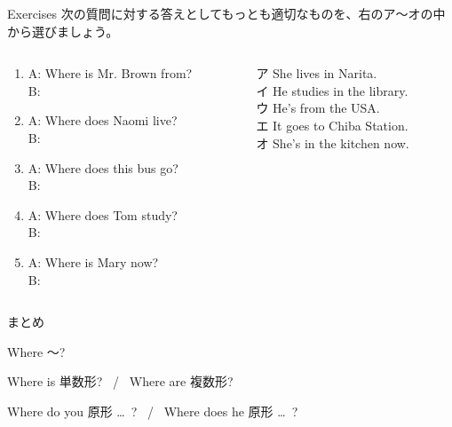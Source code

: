 \documentclass[aspectratio=169,xcolor={dvipsnames,table}]{beamer}
\begin{document}
\begin{frame}[plain]{Exercises}
 次の質問に対する答えとしてもっとも適切なものを、右のア～オの中から選びましょう。

\begin{columns}[t]
 \begin{column}{.475\textwidth}
\begin{enumerate}
 \item A: Where is Mr. Brown from?\\
B: 
 \item A: Where does Naomi live?\\
B: 
 \item A: Where does this bus go?\\
B: 
 \item A: Where does Tom study?\\
B: 
 \item A: Where is Mary now?\\
B: 
\end{enumerate}  
 \end{column}
\begin{column}{.475\textwidth}
\begin{tcolorbox}
ア She lives in Narita.\\
イ He studies in the library.\\
ウ He's from the USA.\\
エ It goes to Chiba Station.\\
オ She's in the kitchen now.
\end{tcolorbox} 
\mbox{}\hfill{}
\end{column}
\end{columns}
\end{frame}
\begin{frame}[plain]{まとめ}
 \begin{block}{Where ～?}
\begin{description}[　　　　]
 \item[be動詞] Where is 単数形?\,\,\,\,\,/\,\,\,\,\,Where are 複数形?
 \item[一般動詞] Where do you 原形 \ldots\,\,\,?\,\,\,\,\,/\,\,\,\,\,Where does he 原形 \ldots\,\,\,?
\end{description}
  
 \end{block}
\end{frame}
\end{document}
